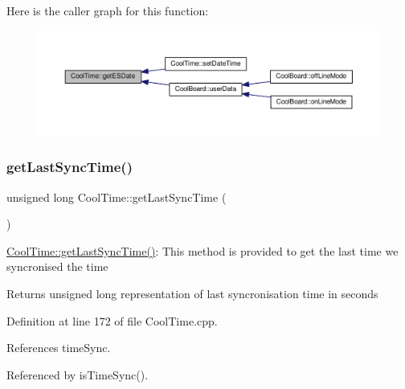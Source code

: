 Here is the caller graph for this function\+:
\nopagebreak
\begin{figure}[H]
\begin{center}
\leavevmode
\includegraphics[width=350pt]{classCoolTime_ac4f32ee513c1328d984306645e8785a4_icgraph}
\end{center}
\end{figure}
\mbox{\label{classCoolTime_a5d17f707a9d337720493b2bce9d41c21}} 
\subsubsection{\texorpdfstring{get\+Last\+Sync\+Time()}{getLastSyncTime()}}
{\footnotesize\ttfamily unsigned long Cool\+Time\+::get\+Last\+Sync\+Time (\begin{DoxyParamCaption}{ }\end{DoxyParamCaption})}

\hyperlink{classCoolTime_a5d17f707a9d337720493b2bce9d41c21}{Cool\+Time\+::get\+Last\+Sync\+Time()}\+: This method is provided to get the last time we syncronised the time

\begin{DoxyReturn}{Returns}
unsigned long representation of last syncronisation time in seconds 
\end{DoxyReturn}


Definition at line 172 of file Cool\+Time.\+cpp.



References time\+Sync.



Referenced by is\+Time\+Sync().


